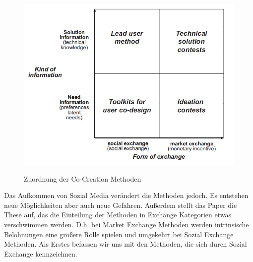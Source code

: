 \begin{figure}[h!]
	\caption{Zuordnung der Co-Creation Methoden\cite{mainreference}}
	\centering
		\includegraphics[scale=0.8]{figures/Co-Creation_Matrix}
	\label{coCreationDiagram}
\end{figure}
Das Aufkommen von Sozial Media ver\"andert die Methoden jedoch. Es entstehen neue M\"oglichkeiten aber auch neue Gefahren.  Au\ss{}erdem stellt das Paper die These auf, das die Einteilung der Methoden in Exchange Kategorien etwas verschwimmen werden. D.h. bei Market Exchange Methoden werden intrinsische Belohnungen eine gr\"o\ss{}ere Rolle spielen und umgekehrt bei Sozial Exchange Methoden. Als Erstes befassen wir uns mit den Methoden, die sich durch Sozial Exchange kennzeichnen.